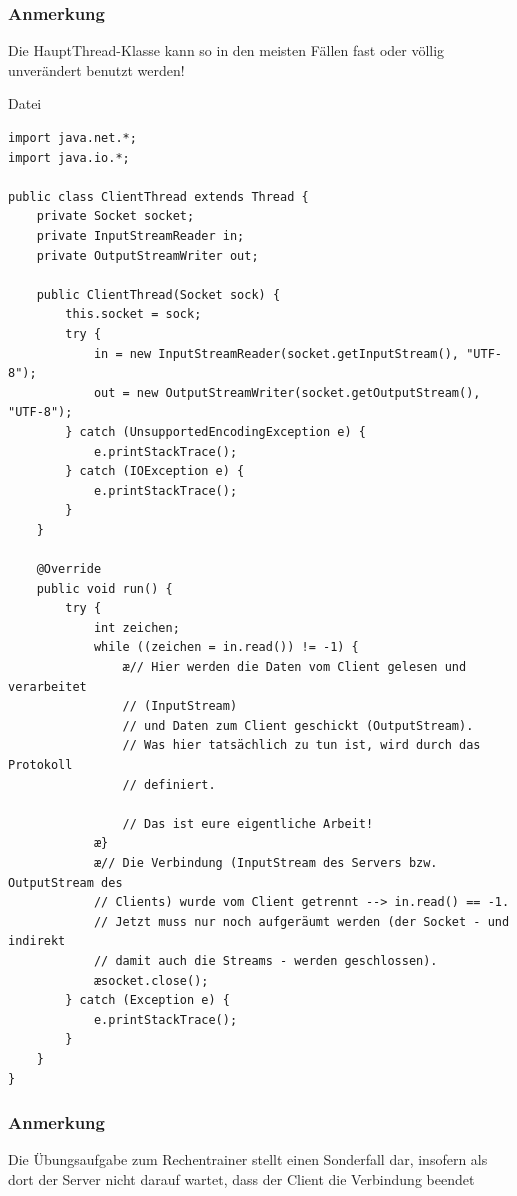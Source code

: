 \subsubsection{Anmerkung}

Die HauptThread-Klasse kann so in den meisten Fällen fast oder völlig
unverändert benutzt werden!

\pagebreak

Datei 

\begin{lstlisting}
import java.net.*;
import java.io.*;

public class ClientThread extends Thread {
    private Socket socket;
    private InputStreamReader in;
    private OutputStreamWriter out;

    public ClientThread(Socket sock) {
        this.socket = sock;
        try {
            in = new InputStreamReader(socket.getInputStream(), "UTF-8");
            out = new OutputStreamWriter(socket.getOutputStream(), "UTF-8");
        } catch (UnsupportedEncodingException e) {
            e.printStackTrace();
        } catch (IOException e) {
            e.printStackTrace();
        }
    }

    @Override
    public void run() {
        try {
            int zeichen;
            while ((zeichen = in.read()) != -1) {
                æ// Hier werden die Daten vom Client gelesen und verarbeitet
                // (InputStream)
                // und Daten zum Client geschickt (OutputStream).
                // Was hier tatsächlich zu tun ist, wird durch das Protokoll
                // definiert.

                // Das ist eure eigentliche Arbeit!
            æ}
            æ// Die Verbindung (InputStream des Servers bzw. OutputStream des
            // Clients) wurde vom Client getrennt --> in.read() == -1.
            // Jetzt muss nur noch aufgeräumt werden (der Socket - und indirekt
            // damit auch die Streams - werden geschlossen).
            æsocket.close();
        } catch (Exception e) {
            e.printStackTrace();
        }
    }
}
\end{lstlisting}

\subsubsection{Anmerkung}

Die Übungsaufgabe zum Rechentrainer stellt einen Sonderfall dar, insofern
als dort der Server nicht darauf wartet, dass der Client die Verbindung beendet

